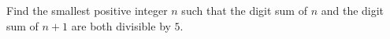Find the smallest positive integer $n$ such that the digit sum of $n$ and the digit sum of $n+1$ are both divisible by $5$.
